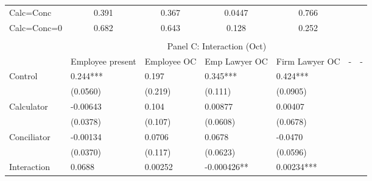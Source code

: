 \begin{tabular}{rrrrrrr}
\multicolumn{1}{l}{Calc=Conc} & \multicolumn{1}{c}{0.391} & \multicolumn{1}{c}{0.367} & \multicolumn{1}{c}{0.0447} & \multicolumn{1}{c}{0.766} & \multicolumn{1}{c}{} & \multicolumn{1}{c}{} \\
\multicolumn{1}{l}{Calc=Conc=0} & \multicolumn{1}{c}{0.682} & \multicolumn{1}{c}{0.643} & \multicolumn{1}{c}{0.128} & \multicolumn{1}{c}{0.252} & \multicolumn{1}{c}{} & \multicolumn{1}{c}{} \\
\bottomrule
\multicolumn{1}{l}{} &       &       &       &       &       &  \\
\toprule
\multicolumn{1}{l}{} & \multicolumn{6}{c}{Panel C: Interaction (Oct)} \\
\midrule
\multicolumn{1}{l}{} & \multicolumn{1}{c}{Employee present} & \multicolumn{1}{c}{Employee OC} & \multicolumn{1}{c}{Emp Lawyer OC} & \multicolumn{1}{c}{Firm Lawyer OC} & \multicolumn{1}{c}{-} & \multicolumn{1}{c}{-} \\
\midrule
\midrule
\multicolumn{1}{l}{Control} & \multicolumn{1}{l}{0.244***} & \multicolumn{1}{l}{0.197} & \multicolumn{1}{l}{0.345***} & \multicolumn{1}{l}{0.424***} & \multicolumn{1}{l}{} & \multicolumn{1}{l}{} \\
\multicolumn{1}{l}{} & \multicolumn{1}{l}{(0.0560)} & \multicolumn{1}{l}{(0.219)} & \multicolumn{1}{l}{(0.111)} & \multicolumn{1}{l}{(0.0905)} & \multicolumn{1}{l}{} & \multicolumn{1}{l}{} \\
\multicolumn{1}{l}{Calculator} & \multicolumn{1}{l}{-0.00643} & \multicolumn{1}{l}{0.104} & \multicolumn{1}{l}{0.00877} & \multicolumn{1}{l}{0.00407} & \multicolumn{1}{l}{} & \multicolumn{1}{l}{} \\
\multicolumn{1}{l}{} & \multicolumn{1}{l}{(0.0378)} & \multicolumn{1}{l}{(0.107)} & \multicolumn{1}{l}{(0.0608)} & \multicolumn{1}{l}{(0.0678)} & \multicolumn{1}{l}{} & \multicolumn{1}{l}{} \\
\multicolumn{1}{l}{Conciliator} & \multicolumn{1}{l}{-0.00134} & \multicolumn{1}{l}{0.0706} & \multicolumn{1}{l}{0.0678} & \multicolumn{1}{l}{-0.0470} & \multicolumn{1}{l}{} & \multicolumn{1}{l}{} \\
\multicolumn{1}{l}{} & \multicolumn{1}{l}{(0.0370)} & \multicolumn{1}{l}{(0.117)} & \multicolumn{1}{l}{(0.0623)} & \multicolumn{1}{l}{(0.0596)} & \multicolumn{1}{l}{} & \multicolumn{1}{l}{} \\
\multicolumn{1}{l}{Interaction} & \multicolumn{1}{l}{0.0688} & \multicolumn{1}{l}{0.00252} & \multicolumn{1}{l}{-0.000426**} & \multicolumn{1}{l}{0.00234***} & \multicolumn{1}{l}{} & \multicolumn{1}{l}{} \\

\end{tabular}

